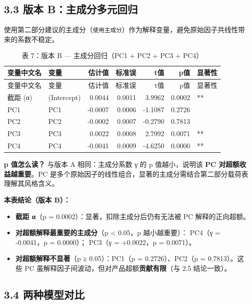 \documentclass[
]{article}
\providecommand{\tightlist}{%
  \setlength{\itemsep}{0pt}\setlength{\parskip}{0pt}}
\begin{document}
\subsection{3.3 版本
B：主成分多元回归}\label{ux7248ux672c-bux4e3bux6210ux5206ux591aux5143ux56deux5f52}

使用第二部分建议的主成分（\texttt{使用主成分}）作为解释变量，避免原始因子共线性带来的系数不稳定。

\begin{longtable}[]{@{}llrrrrl@{}}
\caption{表 7：版本 B --- 主成分回归（PC1 + PC2 + PC3 +
PC4）}\tabularnewline
\toprule\noalign{}
变量中文名 & 变量 & 估计值 & 标准误 & t值 & p值 & 显著性 \\
\midrule\noalign{}
\endfirsthead
\toprule\noalign{}
变量中文名 & 变量 & 估计值 & 标准误 & t值 & p值 & 显著性 \\
\midrule\noalign{}
\endhead
\bottomrule\noalign{}
\endlastfoot
截距 (α) & (Intercept) & 0.0044 & 0.0011 & 3.9962 & 0.0002 & ** \\
PC1 & PC1 & -0.0007 & 0.0006 & -1.1087 & 0.2726 & \\
PC2 & PC2 & -0.0002 & 0.0007 & -0.2790 & 0.7813 & \\
PC3 & PC3 & 0.0022 & 0.0008 & 2.7992 & 0.0071 & ** \\
PC4 & PC4 & -0.0041 & 0.0009 & -4.6250 & 0.0000 & ** \\
\end{longtable}

\textbf{p 值怎么读？} 与版本 A 相同：主成分系数 γ 的 p 值越小，说明该
\textbf{PC 对超额收益越重要}。PC
是多个原始因子的线性组合，显著的主成分需结合第二部分载荷表理解其风格含义。

\textbf{本表结论（版本 B）：}

\begin{itemize}
\tightlist
\item
  \textbf{截距 α}（p = 0.0002）：显著，扣除主成分后仍有无法被 PC
  解释的正向超额。
\item
  \textbf{对超额解释最重要的主成分}（p \textless{} 0.05，p
  越小越重要）： PC4（γ = -0.0041，p = 0.0000）； PC3（γ = +0.0022，p =
  0.0071）。
\item
  \textbf{对超额解释不显著}（p ≥ 0.05）：PC1（p = 0.2726）、PC2（p =
  0.7813）。这些 PC 虽解释因子间波动，但对产品超额\textbf{贡献有限}（与
  2.5 结论一致）。
\end{itemize}

\subsection{3.4
两种模型对比}\label{ux4e24ux79cdux6a21ux578bux5bf9ux6bd4}
\end{document}
